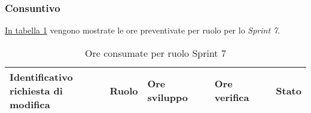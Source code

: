 \subsubsection{Consuntivo}
\hyperref[tab:sprint7_ore_consumate]{In tabella \ref{tab:sprint7_ore_consumate}} vengono mostrate le ore preventivate per ruolo per lo \textit{Sprint 7}.

\begin{table}[H]
    \centering
    \begin{tabular}{| l | l | l | l | l |}
        \hline
            \makecell{\textbf{Identificativo} \\ \textbf{richiesta di modifica}} &
            \textbf{Ruolo} &
            \textbf{Ore sviluppo} &
            \textbf{Ore verifica} &
            \textbf{Stato}\\
        \hline
        \hline
    \end{tabular}
    \caption{Ore consumate per ruolo Sprint 7}
    \label{tab:sprint7_ore_consumate} 
\end{table}